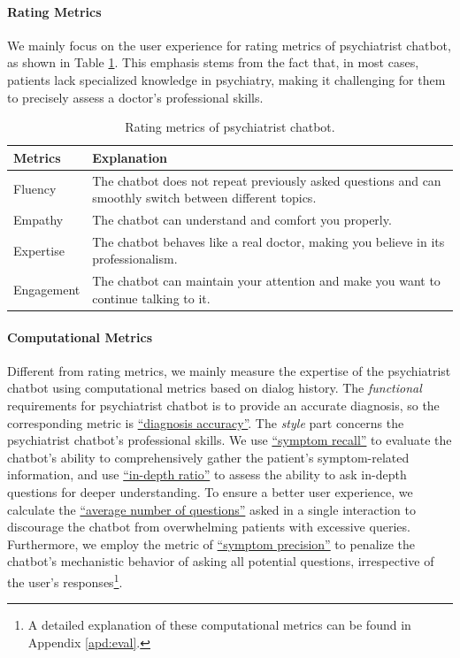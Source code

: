 \paragraph{Rating Metrics} 
We mainly focus on the user experience for rating metrics of psychiatrist chatbot, as shown in Table \ref{tab:human_eval_doctor}. This emphasis stems from the fact that, in most cases, patients lack specialized knowledge in psychiatry, making it challenging for them to precisely assess a doctor's professional skills.
\begin{table}[h]
    \centering
    \footnotesize
    \begin{tabular}{m{}|m{}}
    \hline
    Metrics & Explanation \\
    \hline
    Fluency & The chatbot does not repeat previously asked questions and can smoothly switch between different topics. \\
    \hline
    Empathy & The chatbot can understand and comfort you properly. \\
    \hline
    Expertise & The chatbot behaves like a real doctor, making you believe in its professionalism. \\
    \hline
    Engagement & The chatbot can maintain your attention and make you want to continue talking to it. \\
    \hline
    \end{tabular}
    \caption{Rating metrics of psychiatrist chatbot.}
    \label{tab:human_eval_doctor}
\end{table}
\paragraph{Computational Metrics}
Different from rating metrics, we mainly measure the expertise of the psychiatrist chatbot using computational metrics based on dialog history.
The \textit{functional} requirements for psychiatrist chatbot is to provide an accurate diagnosis, so the corresponding metric is \uline{``diagnosis accuracy''}. 
The \textit{style} part concerns the psychiatrist chatbot's professional skills. We use \uline{``symptom recall''} to evaluate the chatbot's ability to comprehensively gather the patient's symptom-related information, and use \uline{``in-depth ratio''} to assess the ability to ask in-depth questions for deeper understanding. 
To ensure a better user experience, we calculate the \uline{``average number of questions''} asked in a single interaction to discourage the chatbot from overwhelming patients with excessive queries. Furthermore, we employ the metric of \uline{``symptom precision''} to penalize the chatbot's mechanistic behavior of asking all potential questions, irrespective of the user's responses\footnote{A detailed explanation of these computational metrics can be found in Appendix \ref{apd:eval}.\label{footnote:comp_metric}}. 

